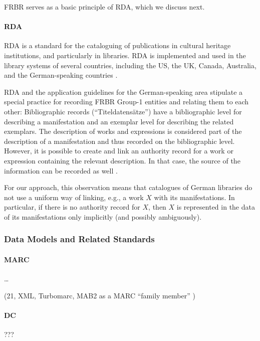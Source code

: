 FRBR serves as a basic principle of RDA, which we discuss next.

\paragraph{RDA}

\gls{RDA} is a standard for the cataloguing of publications
in cultural heritage institutions, and particularly in libraries.
RDA is implemented and used in the library systems of several countries, including
the US, the UK, Canada, Australia, and the German-speaking countries
\cite{WikiDE_RDA}.

RDA and the application guidelines for the German-speaking area
stipulate a special practice for recording FRBR Group-1 entities and relating 
them to each other: Bibliographic records (\enquote{Titeldatensätze})
have a bibliographic level for describing a manifestation
and an exemplar level for describing the related exemplars. The description of works and expressions
is considered part of the description of a manifestation and thus recorded on the bibliographic level.
However, it is possible to create and link an authority record for a work or expression
containing the relevant description. In that case, the source of the information can be recorded as well
\autocite[cf.][Chapter~5.1]{Wiesenmueller2015}.

For our approach, this observation means that catalogues of German libraries
do not use a uniform way of linking, e.g., a work $X$ with its manifestations.
In particular, if there is no authority record for $X$,
then $X$ is represented in the data of its manifestations only implicitly 
(and possibly ambiguously).

\subsubsection{Data Models and Related Standards}

\paragraph{MARC}

\dots

(21, XML, Turbomarc, MAB2 as a MARC \enquote{family member} \autocite[p.204]{Hider2008})

\paragraph{DC} ???

